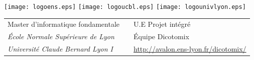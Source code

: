 \documentclass[11pt,a4paper]{article}
\theoremstyle{plain}
\theoremstyle{definition}
\begin{document}
\setlength{\parindent}{0pt}

\thispagestyle{empty}

\texttt{[image: logoens.eps]} \hfill \texttt{[image: logoucbl.eps]} \hfill \texttt{[image: logounivlyon.eps]}

\vspace{0.5cm}

\begin{tabularx}{\textwidth}{@{} l X l @{} }
{\sc Master d'informatique fondamentale} & & U.E Projet intégré\\
{\it École Normale Supérieure de Lyon} & & Équipe Dicotomix\ \\
{\it Université Claude Bernard Lyon I} & & \url{http://avalon.ens-lyon.fr/dicotomix/}
\end{tabularx}
\end{document}
